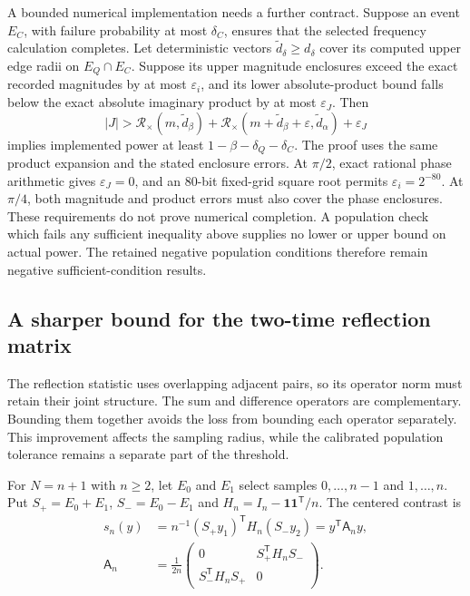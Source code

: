 A bounded numerical implementation needs a further contract. Suppose an event $E_C$, with failure probability at most $\delta_C$, ensures that the selected frequency calculation completes. Let deterministic vectors $\widetilde d_\delta\ge d_\delta$ cover its computed upper edge radii on $E_Q\cap E_C$. Suppose its upper magnitude enclosures exceed the exact recorded magnitudes by at most $\varepsilon_i$, and its lower absolute-product bound falls below the exact absolute imaginary product by at most $\varepsilon_J$. Then
\begin{equation}
 |J|>\mathcal R_\times(m,\widetilde d_\beta)
 +\mathcal R_\times(m+\widetilde d_\beta+\varepsilon,
                    \widetilde d_\alpha)+\varepsilon_J
 \label{cc16:implemented-cycle-power-condition}
\end{equation}
implies implemented power at least $1-\beta-\delta_Q-\delta_C$. The proof uses the same product expansion and the stated enclosure errors. At $\pi/2$, exact rational phase arithmetic gives $\varepsilon_J=0$, and an $80$-bit fixed-grid square root permits $\varepsilon_i=2^{-80}$. At $\pi/4$, both magnitude and product errors must also cover the phase enclosures. These requirements do not prove numerical completion. A population check which fails any sufficient inequality above supplies no lower or upper bound on actual power. The retained negative population conditions therefore remain negative sufficient-condition results.

\subsection{A sharper bound for the two-time reflection matrix}

The reflection statistic uses overlapping adjacent pairs, so its operator norm must retain their joint structure. The sum and difference operators are complementary. Bounding them together avoids the loss from bounding each operator separately. This improvement affects the sampling radius, while the calibrated population tolerance remains a separate part of the threshold.

For $N=n+1$ with $n\ge2$, let $E_0$ and $E_1$ select samples $0,\ldots,n-1$ and $1,\ldots,n$. Put $S_+=E_0+E_1$, $S_-=E_0-E_1$ and $H_n=I_n-\mathbf1\mathbf1^{\mathsf T}/n$. The centered contrast is
\begin{align}
 s_n(y)&=n^{-1}(S_+y_1)^{\mathsf T}H_n(S_-y_2)
       =y^{\mathsf T}\mathsf A_n y,\nonumber\\
 \mathsf A_n&=\frac1{2n}
 \begin{pmatrix}0&S_+^{\mathsf T}H_nS_-\\
 S_-^{\mathsf T}H_nS_+&0\end{pmatrix}.
 \label{cc16:reflection-matrix}
\end{align}

